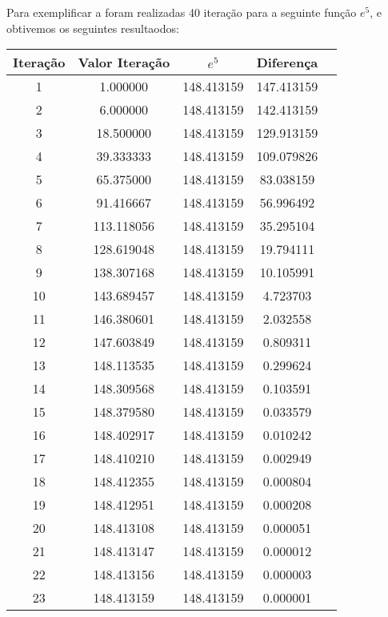 		Para exemplificar a foram realizadas 40 iteração para a seguinte função
		$e^5$, e obtivemos os seguintes resultaodos:

		\begin{table}[H]
			\centering
			\begin{tabular}{|c|c|c|c|c|}
				\hline
				Iteração & Valor Iteração & $e^5$ & Diferença \\
				\hline
				1 & 1.000000 & 148.413159 & 147.413159\\
				\hline
				2 & 6.000000 & 148.413159 & 142.413159\\
				\hline
				3 & 18.500000 & 148.413159 & 129.913159\\
				\hline
				4 & 39.333333 & 148.413159 & 109.079826\\
				\hline
				5 & 65.375000 & 148.413159 & 83.038159\\
				\hline
				6 & 91.416667 & 148.413159 & 56.996492\\
				\hline
				7 & 113.118056 & 148.413159 & 35.295104\\
				\hline
				8 & 128.619048 & 148.413159 & 19.794111\\
				\hline
				9 & 138.307168 & 148.413159 & 10.105991\\
				\hline
				10 & 143.689457 & 148.413159 & 4.723703\\
				\hline
				11 & 146.380601 & 148.413159 & 2.032558\\
				\hline
				12 & 147.603849 & 148.413159 & 0.809311\\
				\hline
				13 & 148.113535 & 148.413159 & 0.299624\\
				\hline
				14 & 148.309568 & 148.413159 & 0.103591\\
				\hline
				15 & 148.379580 & 148.413159 & 0.033579\\
				\hline
				16 & 148.402917 & 148.413159 & 0.010242\\
				\hline
				17 & 148.410210 & 148.413159 & 0.002949\\
				\hline
				18 & 148.412355 & 148.413159 & 0.000804\\
				\hline
				19 & 148.412951 & 148.413159 & 0.000208\\
				\hline
				20 & 148.413108 & 148.413159 & 0.000051\\
				\hline
				21 & 148.413147 & 148.413159 & 0.000012\\
				\hline
				22 & 148.413156 & 148.413159 & 0.000003\\
				\hline
				23 & 148.413159 & 148.413159 & 0.000001\\

\end{tabular}
\end{table}
